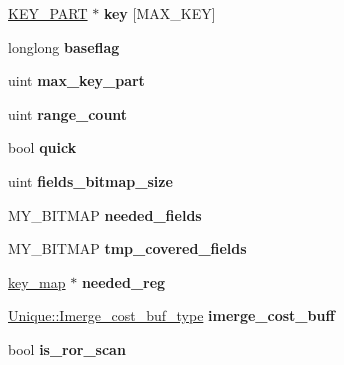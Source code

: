 \begin{DoxyCompactItemize}
\item 
\mbox{\label{classPARAM_a55570ff1fdd76e1aa30e7e135ee91577}} 
\mbox{\hyperlink{structst__key__part}{K\+E\+Y\+\_\+\+P\+A\+RT}} $\ast$ {\bfseries key} \mbox{[}M\+A\+X\+\_\+\+K\+EY\mbox{]}
\item 
\mbox{\label{classPARAM_ae6b0bbe6ab9030a518842f21e8e64a4e}} 
longlong {\bfseries baseflag}
\item 
\mbox{\label{classPARAM_a97288927d2226ac17d90678d8bf8cf91}} 
uint {\bfseries max\+\_\+key\+\_\+part}
\item 
\mbox{\label{classPARAM_a87729c509cda13b3715671486bac9c3b}} 
uint {\bfseries range\+\_\+count}
\item 
\mbox{\label{classPARAM_aa2c05658a015a83c5746e0b8917ab1ef}} 
bool {\bfseries quick}
\item 
\mbox{\label{classPARAM_a8937c04141c8a194114ba92d8cbb5199}} 
uint {\bfseries fields\+\_\+bitmap\+\_\+size}
\item 
\mbox{\label{classPARAM_ab4d21adef21925be3ea06f6431fccfa4}} 
M\+Y\+\_\+\+B\+I\+T\+M\+AP {\bfseries needed\+\_\+fields}
\item 
\mbox{\label{classPARAM_a24ac70405f83c1c69bbaa494f62907e7}} 
M\+Y\+\_\+\+B\+I\+T\+M\+AP {\bfseries tmp\+\_\+covered\+\_\+fields}
\item 
\mbox{\label{classPARAM_a43bd2169620a7f906a74d5cccff2bb66}} 
\mbox{\hyperlink{classBitmap_3_0164_01_4}{key\+\_\+map}} $\ast$ {\bfseries needed\+\_\+reg}
\item 
\mbox{\label{classPARAM_a773135b6fe12ded9ddd8526045ec8db3}} 
\mbox{\hyperlink{classBounds__checked__array}{Unique\+::\+Imerge\+\_\+cost\+\_\+buf\+\_\+type}} {\bfseries imerge\+\_\+cost\+\_\+buff}
\item 
\mbox{\label{classPARAM_a9e176c01a3dcdf25d2a7eff6fae4ee46}} 
bool {\bfseries is\+\_\+ror\+\_\+scan}
\item 

\end{DoxyCompactItemize}
